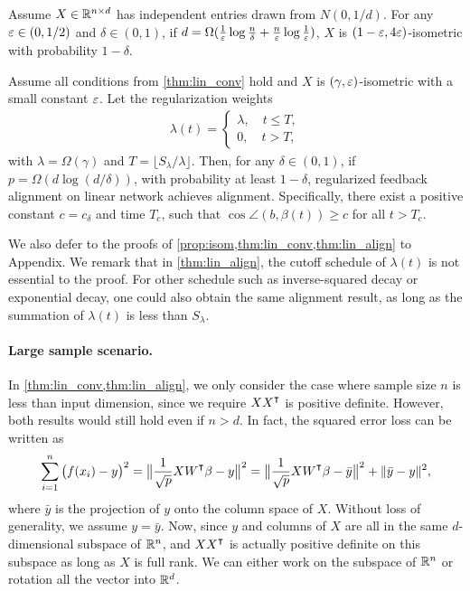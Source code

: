 \begin{proposition}
\label{prop:isom}
Assume $X\in\mathbb{R}^{n\times d}$ has independent entries drawn from $N(0,1/d)$. For any $\varepsilon \in (0,1/2)$ and $\delta \in (0,1)$, if $d=\Omega(\frac{1}{\varepsilon}\log\frac{n}{\delta}+\frac{n}{\varepsilon}\log \frac{1}{\varepsilon})$, $X$ is $(1-\varepsilon, 4\varepsilon)$-isometric with probability $1-\delta$.
\end{proposition}

\begin{theorem}
\label{thm:lin_align}
Assume all conditions from \cref{thm:lin_conv} hold and $X$ is $(\gamma, \varepsilon)$-isometric with a small constant $\varepsilon$. Let the regularization weights
\begin{align*}
\lambda(t) = 
\begin{cases}
    \lambda, \quad t\leq T,\\
    0, \quad t > T,
\end{cases}
\end{align*}
with $\lambda=\Omega(\gamma)$ and $T = \lfloor S_\lambda/\lambda\rfloor$. Then, for any $\delta\in(0,1)$, if $p = \Omega(d\log(d/\delta))$, with probability at least $1-\delta$, regularized feedback alignment on linear network achieves alignment. Specifically, there exist a positive constant $c=c_\delta$ and time $T_c$, such that $\cos\angle(b, \beta(t))\geq c$ for all $t>T_c$.
\end{theorem}

We also defer to the proofs of \cref{prop:isom,thm:lin_conv,thm:lin_align} to Appendix. We remark that in \cref{thm:lin_align}, the cutoff schedule of $\lambda(t)$ is not essential to the proof. For other schedule such as inverse-squared decay or exponential decay, one could also obtain the same alignment result, as long as the summation of $\lambda(t)$ is less than $S_\lambda$.

\paragraph{Large sample scenario.} In \cref{thm:lin_conv,thm:lin_align}, we only consider the case where sample size $n$ is less than input dimension, since we require $XX\transpose$ is positive definite. However, both results would still hold even if $n>d$. In fact, the squared error loss can be written as
\begin{equation*}
\sum_{i=1}^n\big(f(x_i)-y\big)^2 = \big\|\frac{1}{\sqrt{p}}XW\transpose\beta-y\big\|^2 = \big\|\frac{1}{\sqrt{p}}XW\transpose\beta-\bar{y}\big\|^2+ \|\bar{y}-y\|^2,
\end{equation*}
where $\bar{y}$ is the projection of $y$ onto the column space of $X$. Without loss of generality, we assume $y=\bar{y}$. Now, since $y$ and columns of $X$ are all in the same $d$-dimensional subspace of ${\mathbb{R}^n}$, and $XX\transpose$ is actually positive definite on this subspace as long as $X$ is full rank. We can either work on the subspace of ${\mathbb{R}^n}$ or rotation all the vector into ${\mathbb{R}^{d}}$.


